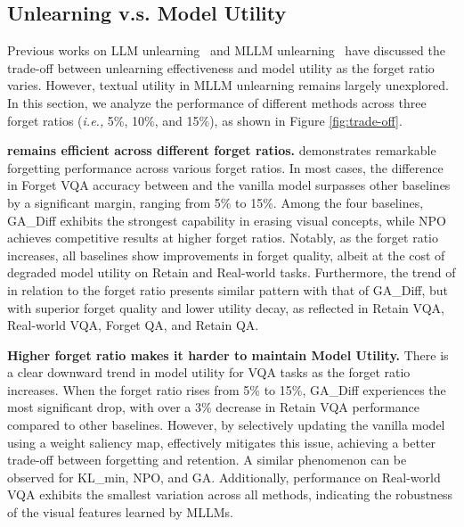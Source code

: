 \subsection{Unlearning v.s. Model Utility}
Previous works on LLM unlearning~\cite{zhang2024npo,liu2024towards} and MLLM unlearning~\cite{liu2024mllmubench} have discussed the trade-off between unlearning effectiveness and model utility as the forget ratio varies. However, textual utility in MLLM unlearning remains largely unexplored. In this section, we analyze the performance of different methods across three forget ratios (\textit{i.e.,} 5\%, 10\%, and 15\%), as shown in Figure \ref{fig:trade-off}. 


 \textbf{\method remains efficient across different forget ratios.} \method demonstrates remarkable forgetting performance across various forget ratios. In most cases, the difference in Forget VQA accuracy between \method and the vanilla model surpasses other baselines by a significant margin, ranging from 5\% to 15\%. Among the four baselines, GA\_Diff exhibits the strongest capability in erasing visual concepts, while NPO achieves competitive results at higher forget ratios. Notably, as the forget ratio increases, all baselines show improvements in forget quality, albeit at the cost of degraded model utility on Retain and Real-world tasks. Furthermore, the trend of \method in relation to the forget ratio presents similar pattern with that of GA\_Diff, but with superior forget quality and lower utility decay, as reflected in Retain VQA, Real-world VQA, Forget QA, and Retain QA.\par

 \textbf{Higher forget ratio makes it harder to maintain Model Utility.} There is a clear downward trend in model utility for VQA tasks as the forget ratio increases. When the forget ratio rises from 5\% to 15\%, GA\_Diff experiences the most significant drop, with over a 3\% decrease in Retain VQA performance compared to other baselines. However, by selectively updating the vanilla model using a weight saliency map, \method effectively mitigates this issue, achieving a better trade-off between forgetting and retention. A similar phenomenon can be observed for KL\_min, NPO, and GA. Additionally, performance on Real-world VQA exhibits the smallest variation across all methods, indicating the robustness of the visual features learned by MLLMs.\par

